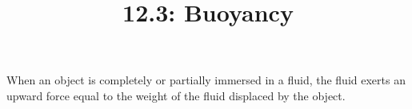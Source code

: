 \documentclass{article}
\title{12.3: Buoyancy}
\begin{document}
\maketitle

\begin{definition}
When an object is completely or partially immersed in a fluid, the fluid exerts an upward force equal to the weight of the fluid displaced by the object.
\end{definition}
\end{document}
